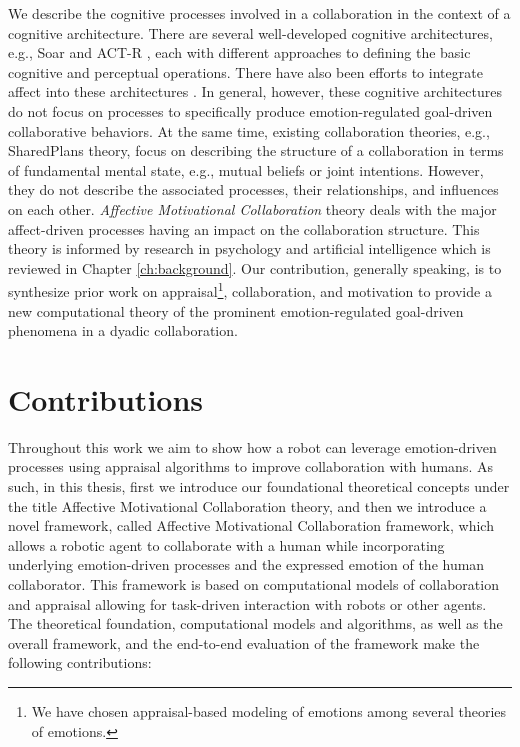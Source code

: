 \documentclass[12pt]{report}
\begin{document}
We describe the cognitive processes involved in a collaboration in the context
of a cognitive architecture. There are several well-developed cognitive
architectures, e.g., Soar \cite{laird:soar} and ACT-R \cite{anderson:act-r},
each with different approaches to defining the basic cognitive and perceptual
operations. There have also been efforts to integrate affect into these
architectures \cite{dancy:actR-physiology-affect, marinier:behavior-emotion}. In
general, however, these cognitive architectures do not focus on processes to
specifically produce emotion-regulated goal-driven collaborative behaviors. At
the same time, existing collaboration theories, e.g., SharedPlans
\cite{grosz:plans-discourse} theory, focus on describing the structure of a
collaboration in terms of fundamental mental state, e.g., mutual beliefs or
joint intentions. However, they do not describe the associated processes, their
relationships, and influences on each other. \textit{Affective Motivational
Collaboration} theory deals with the major affect-driven processes having an
impact on the collaboration structure. This theory is informed by research in
psychology and artificial intelligence which is reviewed in Chapter
\ref{ch:background}. Our contribution, generally speaking, is to synthesize
prior work on appraisal\footnote{We have chosen appraisal-based modeling of
emotions among several theories of emotions.}, collaboration, and motivation to
provide a new computational theory of the prominent emotion-regulated
goal-driven phenomena in a dyadic collaboration.

\section{Contributions}

Throughout this work we aim to show how a robot can leverage emotion-driven
processes using appraisal algorithms to improve collaboration with humans. As
such, in this thesis, first we introduce our foundational theoretical concepts
under the title Affective Motivational Collaboration theory, and then we
introduce a novel framework, called Affective Motivational Collaboration
framework, which allows a robotic agent to collaborate with a human while
incorporating underlying emotion-driven processes and the expressed emotion of
the human collaborator. This framework is based on computational models of
collaboration and appraisal allowing for task-driven interaction with robots or
other agents. The theoretical foundation, computational models and algorithms,
as well as the overall framework, and the end-to-end evaluation of the framework
make the following contributions:
\end{document}
